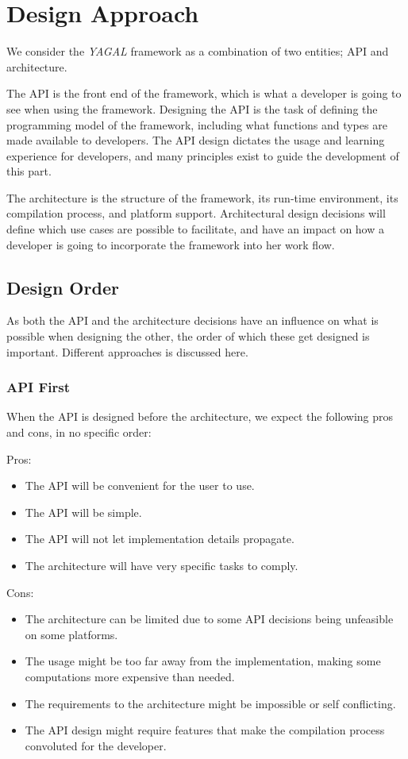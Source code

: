 \section{Design Approach}
We consider the \textit{YAGAL} framework as a combination of two entities; API and architecture.

The API is the front end of the framework, which is what a developer is going to see when using the framework. Designing the API is the task of defining the programming model of the framework, including what functions and types are made available to developers. The API design dictates the usage and learning experience for developers, and many principles exist to guide the development of this part. 

The architecture is the structure of the framework, its run-time environment, its compilation process, and platform support. Architectural design decisions will define which use cases are possible to facilitate, and have an impact on how a developer is going to incorporate the framework into her work flow.

\subsection{Design Order}
As both the API and the architecture decisions have an influence on what is possible when designing the other, the order of which these get designed is important. Different approaches is discussed here.

\subsubsection{API First}
When the API is designed before the architecture, we expect the following pros and cons, in no specific order:

Pros:
\begin{itemize}
\item The API will be convenient for the user to use.
\item The API will be simple.
\item The API will not let implementation details propagate.
\item The architecture will have very specific tasks to comply.
\end{itemize}

Cons:
\begin{itemize}
\item The architecture can be limited due to some API decisions being unfeasible on some platforms.
\item The usage might be too far away from the implementation, making some computations more expensive than needed.
\item The requirements to the architecture might be impossible or self conflicting.
\item The API design might require features that make the compilation process convoluted for the developer.
\end{itemize}

